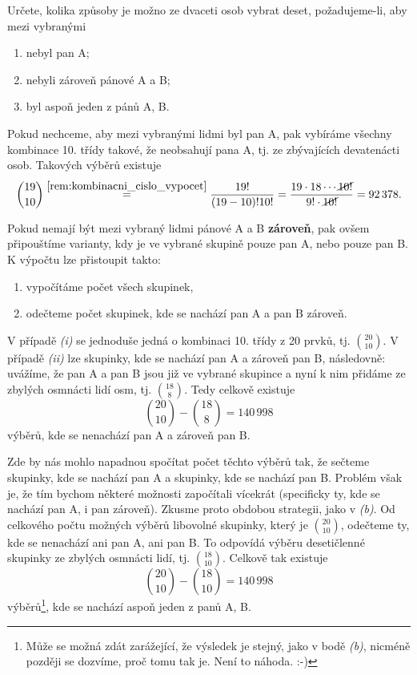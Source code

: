 \begin{task}
    Určete, kolika způsoby je možno ze dvaceti osob vybrat deset, požadujeme-li, aby mezi vybranými
    \begin{enumerate}[label=(\alph*)]
        \item nebyl pan A;
        \item nebyli zároveň pánové A a B;
        \item byl aspoň jeden z pánů A, B.
    \end{enumerate}
    \citep[sekce \emph{Kombinace}]{Farska2007}
\end{task}
\begin{solution}[Řešení (a)]
    Pokud nechceme, aby mezi vybranými lidmi byl pan A, pak vybíráme všechny kombinace 10. třídy takové, že neobsahují pana A, tj. ze zbývajících devatenácti osob. Takových výběrů existuje
    \[\binom{19}{10}\stackrel{\ref{rem:kombinacni_cislo_vypocet}}{=}\dfrac{19!}{(19-10)!10!}=\dfrac{19\cdot 18\cdots\cancel{10!}}{9!\cdot\cancel{10!}}=92\,378.\]
\end{solution}
\begin{solution}[Řešení (b)]
    Pokud nemají být mezi vybraný lidmi pánové A a B \textbf{zároveň}, pak ovšem připouštíme varianty, kdy je ve vybrané skupině pouze pan A, nebo pouze pan B. K výpočtu lze přistoupit takto:
    \begin{enumerate}[label=(\roman*)]
        \item vypočítáme počet všech skupinek,
        \item odečteme počet skupinek, kde se nachází pan A a pan B zároveň.
    \end{enumerate}
    V případě \textit{(i)} se jednoduše jedná o kombinaci 10. třídy z 20 prvků, tj. $\binom{20}{10}$. V případě \textit{(ii)} lze skupinky, kde se nachází pan A a zároveň pan B, následovně: uvážíme, že pan A a pan B jsou již ve vybrané skupince a nyní k nim přidáme ze zbylých osmnácti lidí osm, tj. $\binom{18}{8}$. Tedy celkově existuje
    \[\binom{20}{10}-\binom{18}{8}=140\,998\]
    výběrů, kde se nenachází pan A a zároveň pan B.
\end{solution}
\begin{solution}[Řešení (c)]
    Zde by nás mohlo napadnou spočítat počet těchto výběrů tak, že sečteme skupinky, kde se nachází pan A a skupinky, kde se nachází pan B. Problém však je, že tím bychom některé možnosti započítali vícekrát (specificky ty, kde se nachází pan A, i pan zároveň). Zkusme proto obdobou strategii, jako v \textit{(b)}. Od celkového počtu možných výběrů libovolné skupinky, který je $\binom{20}{10}$, odečteme ty, kde se nenachází ani pan A, ani pan B. To odpovídá výběru desetičlenné skupinky ze zbylých osmnácti lidí, tj. $\binom{18}{10}$. Celkově tak existuje
    \[\binom{20}{10}-\binom{18}{10}=140\,998\]
    výběrů\footnote{Může se možná zdát zarážející, že výsledek je stejný, jako v bodě \textit{(b)}, nicméně později se dozvíme, proč tomu tak je. Není to náhoda. :-)}, kde se nachází aspoň jeden z panů A, B.
\end{solution}